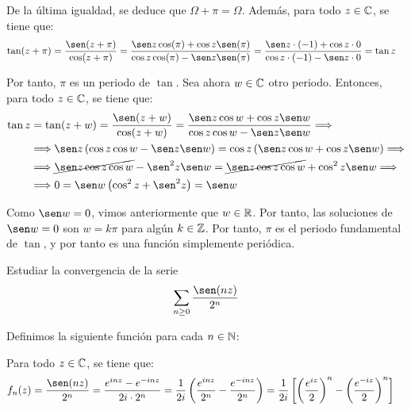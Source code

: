 \begin{ejercicio}
    De la última igualdad, se deduce que $\Omega+\pi=\Omega$. Además, para todo $z\in \mathbb{C}$, se tiene que:
    \begin{align*}
        \tan(z+\pi) &= \frac{\sen(z+\pi)}{\cos(z+\pi)} = \frac{\sen z\cos(\pi)+\cos z\sen(\pi)}{\cos z\cos(\pi)-\sen z\sen(\pi)} = \frac{\sen z\cdot (-1)+\cos z\cdot 0}{\cos z\cdot (-1)-\sen z\cdot 0} = \tan z
    \end{align*}

    Por tanto, $\pi$ es un periodo de $\tan$. Sea ahora $w\in \mathbb{C}$ otro periodo. Entonces, para todo $z\in \mathbb{C}$, se tiene que:
    \begin{align*}
        \tan z &= \tan(z+w) = \frac{\sen(z+w)}{\cos(z+w)} = \frac{\sen z\cos w + \cos z\sen w}{\cos z\cos w - \sen z\sen w}
        \Longrightarrow\\&\Longrightarrow
        \sen z \left(\cos z \cos w - \sen z\sen w\right) = \cos z \left(\sen z \cos w + \cos z\sen w\right)
        \Longrightarrow\\&\Longrightarrow
        \cancel{\sen z \cos z \cos w} - \sen^2 z \sen w = \cancel{\sen z \cos z \cos w} + \cos^2 z \sen w
        \Longrightarrow\\&\Longrightarrow
        0 = \sen w\left(\cos^2 z + \sen^2 z\right) = \sen w
    \end{align*}
    
    Como $\sen w=0$, vimos anteriormente que $w\in \mathbb{R}$. Por tanto, las soluciones de $\sen w=0$ son $w=k\pi$ para algún $k\in \mathbb{Z}$. Por tanto, $\pi$ es el periodo fundamental de $\tan$, y por tanto es una función simplemente periódica.
\end{ejercicio}

\begin{ejercicio}
    Estudiar la convergencia de la serie
    \[
        \sum_{n\geq 0} \frac{\sen(nz)}{2^n}
    \]

    Definimos la siguiente función para cada $n\in \mathbb{N}$:

    Para todo $z\in \mathbb{C}$, se tiene que:
    \begin{align*}
        f_n(z) &= \frac{\sen(nz)}{2^n} = \frac{e^{inz}-e^{-inz}}{2i\cdot 2^n} = \frac{1}{2i}\left(\frac{e^{inz}}{2^n}-\frac{e^{-inz}}{2^n}\right) = \frac{1}{2i}\left[\left(\frac{e^{iz}}{2}\right)^{n}-\left(\frac{e^{-iz}}{2}\right)^{n}\right]
    \end{align*}
\end{ejercicio}

